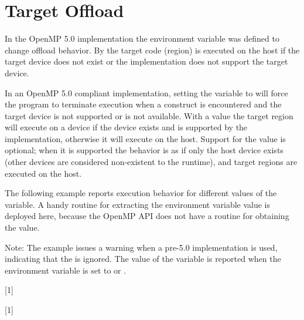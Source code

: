 \pagebreak
\section{Target Offload}
\label{sec:target_offload}

In the OpenMP 5.0 implementation the 
environment variable was defined to change  offload behavior. 
By  the target code (region) is executed on the host if the target device 
does not exist or the implementation does not support the target device.  

In an OpenMP 5.0 compliant implementation, setting the 
 variable to  will 
force the program to terminate execution when a  
construct is encountered and the target device is not supported or is not available.
With a value  the target region will execute on a device if the 
device exists and is supported by the implementation,
otherwise it will execute on the host.
Support for the 
value is optional; when it is supported the behavior is as if only the 
host device exists (other devices are considered non-existent to the runtime), 
and target regions are executed on the host.  

The following example reports execution behavior for different 
values of the  variable. A handy routine 
for extracting the  environment variable
value is deployed here, because the OpenMP API does not have a routine 
for obtaining the value. %

Note: 
The example issues a warning when a pre-5.0 implementation is used,
indicating that the  is ignored.
The value of the  variable is reported 
when the  
environment variable is set to  or .

{}[1]

{}[1]


